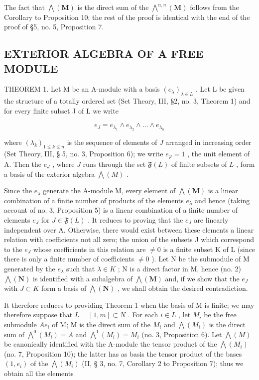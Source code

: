 The fact that \(\bigwedge (\mathbf{M})\) is the direct sum of the \(\bigwedge^{\alpha ,n}(\mathbf{M})\) follows from the Corollary to Proposition 10; the rest of the proof is identical with the end of the proof of §5, no. 5, Proposition 7.

\subsection{EXTERIOR ALGEBRA OF A FREE MODULE}

THEOREM 1. Let M be an A-module with a basis \((e_{\lambda})_{\lambda \in L}\) . Let L be given the structure of a totally ordered set (Set Theory, III, §2, no. 3, Theorem 1) and for every finite subset J of L we write

\[
e _ {J} = e _ {\lambda_ {1}} \wedge e _ {\lambda_ {2}} \wedge \dots \wedge e _ {\lambda_ {n}}\tag{18}
\]

where \((\lambda_k)_{1 \leqslant k \leqslant n}\) is the sequence of elements of \(J\) arranged in increasing order (Set Theory, III, § 5, no. 3, Proposition 6); we write \(e_\varphi = 1\) , the unit element of A. Then the \(e_J\) , where \(J\) runs through the set \(\mathfrak{F}(L)\) of finite subsets of \(L\) , form a basis of the exterior algebra \(\bigwedge(M)\) .

Since the \(e_{\lambda}\) generate the A-module M, every element of \(\bigwedge(\mathbf{M})\) is a linear combination of a finite number of products of the elements \(e_{\lambda}\) and hence (taking account of no. 3, Proposition 5) is a linear combination of a finite number of elements \(e_{J}\) for \(J \in \mathfrak{F}(L)\) . It reduces to proving that the \(e_{J}\) are linearly independent over A. Otherwise, there would exist between these elements a linear relation with coefficients not all zero; the union of the subsets J which correspond to the \(e_{J}\) whose coefficients in this relation are \(\neq 0\) is a finite subset K of L (since there is only a finite number of coefficients \(\neq 0\) ). Let N be the submodule of M generated by the \(e_{\lambda}\) such that \(\lambda \in K\) ; N is a direct factor in M, hence (no. 2) \(\bigwedge(\mathbf{N})\) is identified with a subalgebra of \(\bigwedge(\mathbf{M})\) and, if we show that the \(e_{J}\) with \(J \subset K\) form a basis of \(\bigwedge(\mathbf{N})\) , we shall obtain the desired contradiction.

It therefore reduces to providing Theorem 1 when the basis of M is finite; we may therefore suppose that \(L = [1, m] \subset N\) . For each \(i \in L\) , let \(M_i\) be the free submodule \(Ae_i\) of M; M is the direct sum of the \(M_i\) and \(\bigwedge(M_i)\) is the direct sum of \(\bigwedge^0(M_i) = A\) and \(\bigwedge^1(M_i) = M_i\) (no. 3, Proposition 6). Let \(\bigwedge(M)\) be canonically identified with the A-module the tensor product of the \(\bigwedge(M_i)\) (no. 7, Proposition 10); the latter has as basis the tensor product of the bases \((1, e_i)\) of the \(\bigwedge(M_i)\) (II, § 3, no. 7, Corollary 2 to Proposition 7); thus we obtain all the elements

